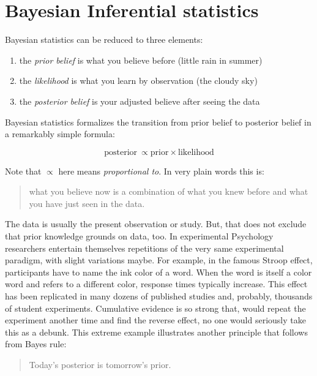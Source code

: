 \documentclass[]{svmono}
\providecommand{\tightlist}{%
  \setlength{\itemsep}{0pt}\setlength{\parskip}{0pt}}
\theoremstyle{definition}
\theoremstyle{definition}
\theoremstyle{definition}
\theoremstyle{remark}
\begin{document}
\section{Bayesian Inferential
statistics}\label{bayesian-inferential-statistics}

Bayesian statistics can be reduced to three elements:

\begin{enumerate}
\def\labelenumi{\arabic{enumi}.}
\tightlist
\item
  the \emph{prior belief} is what you believe before (little rain in
  summer)
\item
  the \emph{likelihood} is what you learn by observation (the cloudy
  sky)
\item
  the \emph{posterior belief} is your adjusted believe after seeing the
  data
\end{enumerate}

Bayesian statistics formalizes the transition from prior belief to
posterior belief in a remarkably simple formula:

\[\text{posterior}\ \propto \text{prior}\times\text{likelihood}\]

Note that \(\propto\) here means \emph{proportional to}. In very plain
words this is:

\begin{quote}
what you believe now is a combination of what you knew before and what
you have just seen in the data.
\end{quote}

The data is usually the present observation or study. But, that does not
exclude that prior knowledge grounds on data, too. In experimental
Psychology researchers entertain themselves repetitions of the very same
experimental paradigm, with slight variations maybe. For example, in the
famous Stroop effect, participants have to name the ink color of a word.
When the word is itself a color word and refers to a different color,
response times typically increase. This effect has been replicated in
many dozens of published studies and, probably, thousands of student
experiments. Cumulative evidence is so strong that, would repeat the
experiment another time and find the reverse effect, no one would
seriously take this as a debunk. This extreme example illustrates
another principle that follows from Bayes rule:

\begin{quote}
Today's posterior is tomorrow's prior.
\end{quote}
\end{document}
